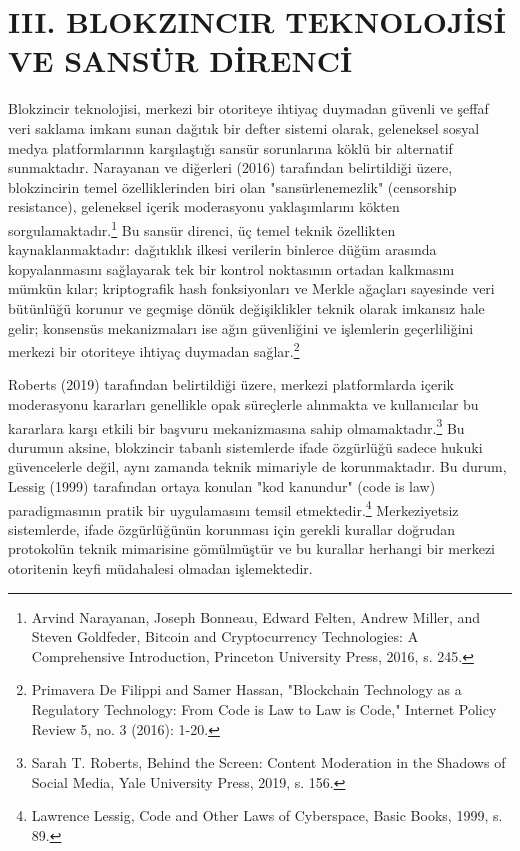 \documentclass[11pt,a4paper]{article}
\begin{document}
\section*{\fontsize{12}{14}\selectfont\bfseries III. BLOKZINCIR TEKNOLOJİSİ VE SANSÜR DİRENCİ}

Blokzincir teknolojisi, merkezi bir otoriteye ihtiyaç duymadan güvenli ve şeffaf veri saklama imkanı sunan dağıtık bir defter sistemi olarak, geleneksel sosyal medya platformlarının karşılaştığı sansür sorunlarına köklü bir alternatif sunmaktadır. Narayanan ve diğerleri (2016) tarafından belirtildiği üzere, blokzincirin temel özelliklerinden biri olan "sansürlenemezlik" (censorship resistance), geleneksel içerik moderasyonu yaklaşımlarını kökten sorgulamaktadır.\footnote{Arvind Narayanan, Joseph Bonneau, Edward Felten, Andrew Miller, and Steven Goldfeder, Bitcoin and Cryptocurrency Technologies: A Comprehensive Introduction, Princeton University Press, 2016, s. 245.} Bu sansür direnci, üç temel teknik özellikten kaynaklanmaktadır: dağıtıklık ilkesi verilerin binlerce düğüm arasında kopyalanmasını sağlayarak tek bir kontrol noktasının ortadan kalkmasını mümkün kılar; kriptografik hash fonksiyonları ve Merkle ağaçları sayesinde veri bütünlüğü korunur ve geçmişe dönük değişiklikler teknik olarak imkansız hale gelir; konsensüs mekanizmaları ise ağın güvenliğini ve işlemlerin geçerliliğini merkezi bir otoriteye ihtiyaç duymadan sağlar.\footnote{Primavera De Filippi and Samer Hassan, "Blockchain Technology as a Regulatory Technology: From Code is Law to Law is Code," Internet Policy Review 5, no. 3 (2016): 1-20.}

Roberts (2019) tarafından belirtildiği üzere, merkezi platformlarda içerik moderasyonu kararları genellikle opak süreçlerle alınmakta ve kullanıcılar bu kararlara karşı etkili bir başvuru mekanizmasına sahip olmamaktadır.\footnote{Sarah T. Roberts, Behind the Screen: Content Moderation in the Shadows of Social Media, Yale University Press, 2019, s. 156.} Bu durumun aksine, blokzincir tabanlı sistemlerde ifade özgürlüğü sadece hukuki güvencelerle değil, aynı zamanda teknik mimariyle de korunmaktadır. Bu durum, Lessig (1999) tarafından ortaya konulan "kod kanundur" (code is law) paradigmasının pratik bir uygulamasını temsil etmektedir.\footnote{Lawrence Lessig, Code and Other Laws of Cyberspace, Basic Books, 1999, s. 89.} Merkeziyetsiz sistemlerde, ifade özgürlüğünün korunması için gerekli kurallar doğrudan protokolün teknik mimarisine gömülmüştür ve bu kurallar herhangi bir merkezi otoritenin keyfi müdahalesi olmadan işlemektedir.
\end{document}
